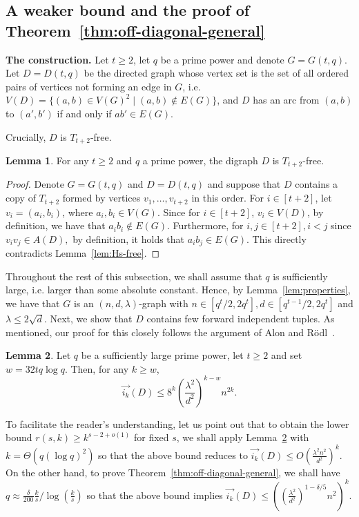\documentclass{article}
\theoremstyle{plain}
\newtheorem{lemma}[theorem]{Lemma}
\theoremstyle{definition}
\newtheorem{lemma}{Lemma}
\newcommand{\fwi}[1]{\overrightarrow{i_{#1}}}
\begin{document}
\subsection{A weaker bound and the proof of Theorem~\ref{thm:off-diagonal-general}} \label{subsec:old}

\textbf{The construction.}
Let $t \ge 2$, let $q$ be a prime power and denote $G = G(t, q)$. Let $D = D(t, q)$ be the directed graph whose vertex set is the set of all ordered pairs of vertices not forming an edge in $G$, i.e. $V(D) = \{ (a, b) \in V(G)^2 \mid (a, b) \not\in E(G) \}$, and $D$ has an arc from $(a, b)$ to $(a', b')$ if and only if $ab' \in E(G)$. 

Crucially, $D$ is $T_{t+2}$-free.
\begin{lemma} \label{lem:t+2-free}
    For any $t \ge 2$ and $q$ a prime power, the digraph $D$ is $T_{t+2}$-free.
\end{lemma}
\begin{proof}
    Denote $G = G(t, q)$ and $D = D(t, q)$ and suppose that $D$ contains a copy of $T_{t+2}$ formed by vertices $v_1, \dots, v_{t+2}$ in this order. For $i \in [t+2]$, let $v_i = (a_i, b_i)$, where $a_i, b_i \in V(G)$. Since for $i \in [t+2]$, $v_i \in V(D)$, by definition, we have that $a_i b_i \not\in E(G)$. Furthermore, for $i, j \in [t+2], i < j$ since $v_i v_j \in A(D),$ by definition, it holds that $a_i b_j \in E(G)$. This directly contradicts Lemma~\ref{lem:Hs-free}.
\end{proof}

Throughout the rest of this subsection, we shall assume that $q$ is sufficiently large, i.e. larger than some absolute constant. Hence, by Lemma~\ref{lem:properties}, we have that $G$ is an $(n, d, \lambda)$-graph with $n \in [q^t / 2, 2q^t], d \in [q^{t-1} / 2, 2q^t]$ and $\lambda \le 2 \sqrt{d}$.
Next, we show that $D$ contains few forward independent tuples. As mentioned, our proof for this closely follows the argument of Alon and R\"{o}dl~\cite{alon-rodl}.

\begin{lemma} \label{lem:old-fw-indep-counting}
    Let $q$ be a sufficiently large prime power, let $t \ge 2$ and set $w = 32 t q \log q$. Then, for any $k \ge w$,
    \[ \fwi{k}(D) \le 8^k \left(\frac{\lambda^2}{d^2}\right)^{k-w}  n^{2k}. \]
\end{lemma}
To facilitate the reader's understanding, let us point out that to obtain the lower bound $r(s, k) \ge k^{s-2+o(1)}$ for fixed $s$, we shall apply Lemma~\ref{lem:old-fw-indep-counting} with $k = \Theta(q (\log q)^2)$ so that the above bound reduces to $\fwi{k}(D) \le O\left( \frac{\lambda^2 n^2}{d^2} \right)^k$. On the other hand, to prove Theorem~\ref{thm:off-diagonal-general}, we shall have $q \approx \frac{\delta}{200} \frac{k}{s} / \log\left( \frac{k}{s}\right)$ so that the above bound implies $\fwi{k}(D) \le \left(\left(\frac{\lambda^2}{d^2}\right)^{1 - \delta/5} n^2\right)^k$.
\end{document}
